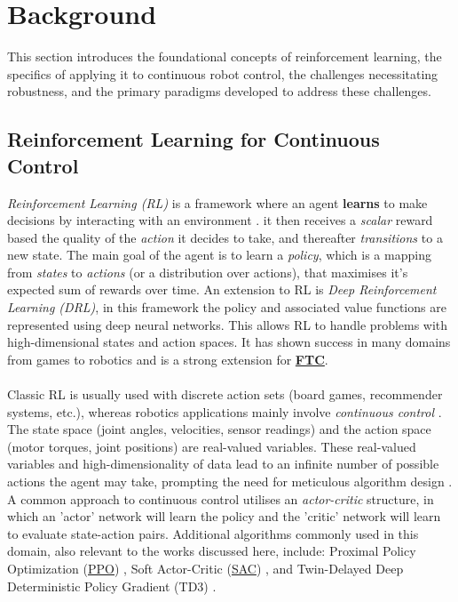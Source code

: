 \documentclass[12pt, a4paper]{article} %
\begin{document}

\section{Background}
\label{sec:background}

This section introduces the foundational concepts of reinforcement learning, the specifics of applying it to continuous robot control, the challenges necessitating robustness, and the primary paradigms developed to address these challenges.

\subsection{Reinforcement Learning for Continuous Control}
\textit{Reinforcement Learning (RL)} is a framework where an agent \textbf{learns} to make decisions by interacting with an environment \citep{sutton2018}. it then receives a \textit{scalar} reward based the quality of the \textit{action} it decides to take, and thereafter \textit{transitions} to a new state. The main goal of the agent is to learn a \textit{policy}, which is a mapping from \textit{states} to \textit{actions} (or a distribution over actions),  that maximises it's expected sum of rewards over time. An extension to RL is \textit{Deep Reinforcement Learning (DRL)}, in this framework the policy and associated value functions are represented using deep neural networks. This allows RL to handle problems with high-dimensional states and action spaces. It has shown success in many domains from games to robotics \citep{mnih2015human, levine2018learning, silver2017mastering} and is a strong extension for \textbf{\hyperref[def:ftc]{FTC}}.
\noindent\\\\
Classic RL is usually used with discrete action sets (board games, recommender systems, etc.), whereas robotics applications mainly involve \textit{continuous control} \citep{kober2013survey}. The state space (joint angles, velocities, sensor readings) and the action space (motor torques, joint positions) are real-valued variables. These real-valued variables and high-dimensionality of data lead to an infinite number of possible actions the agent may take, prompting the need for meticulous algorithm design \citep{kober2013survey, recht2019tour}. A common approach to continuous control utilises an \textit{actor-critic} structure, in which an 'actor' network will learn the policy and the 'critic' network will learn to evaluate state-action pairs. Additional algorithms commonly used in this domain, also relevant to the works discussed here, include: Proximal Policy Optimization (\hyperref[def:ppo]{PPO}) \citep{schulman2017proximal, liu2023saving, pham2024adaptive}, Soft Actor-Critic (\hyperref[def:sac]{SAC}) \citep{haarnoja2018soft}, and Twin-Delayed Deep Deterministic Policy Gradient (TD3) \citep{fujimoto2018addressing, jia2023robust}.
\end{document}
